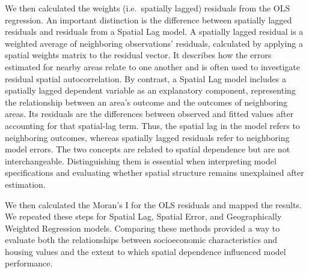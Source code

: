 \documentclass[
  12pt,
]{article}
\begin{document}
We then calculated the weights (i.e.~spatially lagged) residuals from
the OLS regression. An important distinction is the difference between
spatially lagged residuals and residuals from a Spatial Lag model. A
spatially lagged residual is a weighted average of neighboring
observations' residuals, calculated by applying a spatial weights matrix
to the residual vector. It describes how the errors estimated for nearby
areas relate to one another and is often used to investigate residual
spatial autocorrelation. By contrast, a Spatial Lag model includes a
spatially lagged dependent variable as an explanatory component,
representing the relationship between an area's outcome and the outcomes
of neighboring areas. Its residuals are the differences between observed
and fitted values after accounting for that spatial-lag term. Thus, the
spatial lag in the model refers to neighboring outcomes, whereas
spatially lagged residuals refer to neighboring model errors. The two
concepts are related to spatial dependence but are not interchangeable.
Distinguishing them is essential when interpreting model specifications
and evaluating whether spatial structure remains unexplained after
estimation.

We then calculated the Moran's I for the OLS residuals and mapped the
results. We repeated these steps for Spatial Lag, Spatial Error, and
Geographically Weighted Regression models. Comparing these methods
provided a way to evaluate both the relationships between socioeconomic
characteristics and housing values and the extent to which spatial
dependence influenced model performance.
\end{document}
